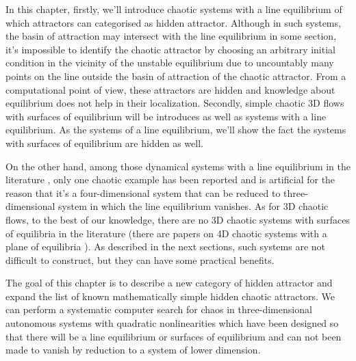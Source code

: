 In this chapter, firstly, we'll introduce chaotic systems with a line equilibrium of which attractors 
can categorised as hidden attractor.
Although in such systems, the basin of attraction may intersect with the line equilibrium  
in some section, it's impossible to identify the chaotic attractor by choosing an arbitrary initial 
condition in the vicinity of the unstable equilibrium due to uncountably many points on the line 
outside the basin of attraction of the chaotic attractor. From a computational point of view,
these attractors are hidden and knowledge about equilibrium does not help in their localization.
Secondly, simple chaotic 3D flows with surfaces of equilibrium will be introduces as well as
systems with a line equilibrium. As the systems of a line equilibrium, we'll show the fact
the systems with surfaces of equilibrium are hidden as well.

On the other hand, among those dynamical systems with a line equilibrium in the literature
\cite{MARCELO2012HOPF,Fiedler2000Generic,Fiedler2000Generic2,BERNOLD2012GENERIC},
only one chaotic example has been reported \cite{Zhou2013A} and is artificial for the reason
that it's a four-dimensional
system that can be reduced to three-dimensional system in which the line equilibrium vanishes.
As for 3D chaotic flows, to the best of our knowledge, there are no 3D chaotic systems
with surfaces of equilibria in the literature (there are
papers on 4D chaotic systems with a plane of equilibria
\cite{42_Jafari2016A}). As described in the next sections, such systems
are not difficult to construct, but they can have some
practical benefits.

The goal of this chapter is to describe a new category of hidden attractor and expand the list of
known mathematically simple hidden chaotic attractors. We can perform a systematic computer
search for chaos in three-dimensional autonomous systems with quadratic nonlinearities which
have been designed so that there will be a line equilibrium or surfaces of equilibrium and can not
been made to vanish by reduction to a system of lower dimension.

